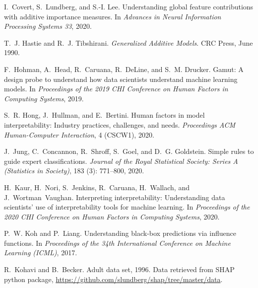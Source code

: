 \documentclass[11pt,dvipdfmx]{article}
\begin{document}
\begin{thebibliography}{10}
\begin{small}
I.~Covert, S.~Lundberg, and S.-I. Lee.
\newblock Understanding global feature contributions with additive importance
  measures.
\newblock In \emph{Advances in Neural Information Processing Systems 33}, 2020.

T.~J. Hastie and R.~J. Tibshirani.
\newblock \emph{Generalized Additive Models}.
\newblock CRC Press, June 1990.

F.~Hohman, A.~Head, R.~Caruana, R.~DeLine, and S.~M. Drucker.
\newblock Gamut: A design probe to understand how data scientists understand
  machine learning models.
\newblock In \emph{Proceedings of the 2019 CHI Conference on Human Factors in Computing
  Systems}, 2019.

S.~R. Hong, J.~Hullman, and E.~Bertini.
\newblock Human factors in model interpretability: Industry practices,
  challenges, and needs.
\newblock \emph{Proceedings ACM Human-Computer Interaction}, 4 (CSCW1), 2020.

J.~Jung, C.~Concannon, R.~Shroff, S.~Goel, and D.~G. Goldstein.
\newblock Simple rules to guide expert classifications.
\newblock \emph{Journal of the Royal Statistical Society: Series A (Statistics
  in Society)}, 183 (3): 771--800, 2020.

H.~Kaur, H.~Nori, S.~Jenkins, R.~Caruana, H.~Wallach, and J.~Wortman~Vaughan.
\newblock Interpreting interpretability: Understanding data scientists’ use
  of interpretability tools for machine learning.
\newblock In \emph{Proceedings of the 2020 CHI Conference on Human Factors in
  Computing Systems}, 2020.

P.~W. Koh and P.~Liang.
\newblock Understanding black-box predictions via influence functions.
\newblock In \emph{Proceedings of the 34th International Conference on Machine
  Learning ({ICML})}, 2017.

R.~Kohavi and B.~Becker.
\newblock Adult data set, 1996.
\newblock Data retrieved from SHAP python package,
  \url{https://github.com/slundberg/shap/tree/master/data}.


\end{small}
\end{thebibliography}
\end{document}
